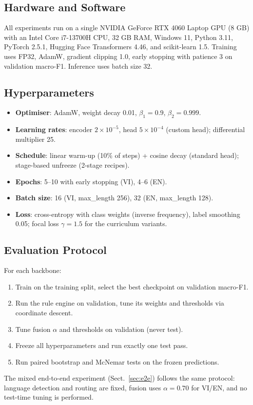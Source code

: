 \subsection{Hardware and Software}
\label{sec:hardware}
All experiments run on a single NVIDIA GeForce RTX 4060 Laptop GPU (8 GB) with
an Intel Core i7-13700H CPU, 32 GB RAM, Windows 11, Python 3.11, PyTorch
2.5.1, Hugging Face Transformers 4.46, and scikit-learn 1.5.  Training uses
FP32, AdamW, gradient clipping 1.0, early stopping with patience 3 on
validation macro-F1.  Inference uses batch size 32.

\subsection{Hyperparameters}
\label{sec:hyperparameters}
\begin{itemize}
    \item \textbf{Optimiser}: AdamW, weight decay 0.01, $\beta_1=0.9$,
          $\beta_2=0.999$.
    \item \textbf{Learning rates}: encoder $2\times10^{-5}$, head
          $5\times10^{-4}$ (custom head); differential multiplier 25.
    \item \textbf{Schedule}: linear warm-up (10\% of steps) + cosine decay
          (standard head); stage-based unfreeze (2-stage recipes).
    \item \textbf{Epochs}: 5–10 with early stopping (VI), 4–6 (EN).
    \item \textbf{Batch size}: 16 (VI, max\_length 256), 32 (EN, max\_length 128).
    \item \textbf{Loss}: cross-entropy with class weights (inverse frequency),
          label smoothing 0.05; focal loss $\gamma=1.5$ for the curriculum
          variants.
\end{itemize}

\subsection{Evaluation Protocol}
\label{sec:protocol}
For each backbone:
\begin{enumerate}
    \item Train on the training split, select the best checkpoint on validation
          macro-F1.
    \item Run the rule engine on validation, tune its weights and thresholds
          via coordinate descent.
    \item Tune fusion $\alpha$ and thresholds on validation (never test).
    \item Freeze all hyperparameters and run exactly one test pass.
    \item Run paired bootstrap and McNemar tests on the frozen predictions.
\end{enumerate}
The mixed end-to-end experiment (Sect.~\ref{sec:e2e}) follows the same
protocol: language detection and routing are fixed, fusion uses
$\alpha=0.70$ for VI/EN, and no test-time tuning is performed.
